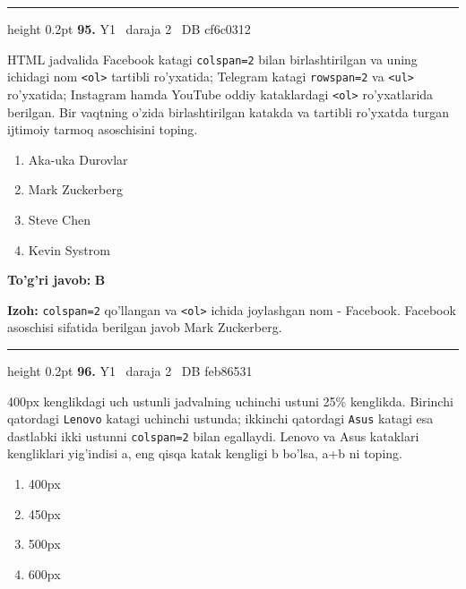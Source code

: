 \documentclass[10pt,a4paper,oneside]{article}
\begin{document}
\vspace{2mm}\hrule height 0.2pt \vspace{4mm}
\hypertarget{q95}{\textbf{\color{ink}95.}}  {\color{muted}\scriptsize Y1 \textbullet\ daraja 2 \textbullet\ DB cf6c0312}
\par
HTML jadvalida Facebook katagi \texttt{colspan=2} bilan birlashtirilgan va uning ichidagi nom \texttt{\textless{}ol\textgreater{}} tartibli ro'yxatida; Telegram katagi \texttt{rowspan=2} va \texttt{\textless{}ul\textgreater{}} ro'yxatida; Instagram hamda YouTube oddiy kataklardagi \texttt{\textless{}ol\textgreater{}} ro'yxatlarida berilgan. Bir vaqtning o'zida birlashtirilgan katakda va tartibli ro'yxatda turgan ijtimoiy tarmoq asoschisini toping.
\begin{enumerate}[label=\Alph*),leftmargin=9mm]
\item Aka-uka Durovlar
\item Mark Zuckerberg
\item Steve Chen
\item Kevin Systrom
\end{enumerate}
\begin{tcolorbox}[enhanced,breakable,colback=teal!4,colframe=teal!45!black,boxrule=0.45pt,arc=1.2mm,left=2.8mm,right=2.8mm,top=2mm,bottom=2mm,before skip=2mm,after skip=2mm]
\textbf{\color{teal}To'g'ri javob:} \textbf{B}
\par\smallskip
\textbf{Izoh:} \texttt{colspan=2} qo'llangan va \texttt{\textless{}ol\textgreater{}} ichida joylashgan nom - Facebook. Facebook asoschisi sifatida berilgan javob Mark Zuckerberg.
\end{tcolorbox}
\vspace{2mm}\hrule height 0.2pt \vspace{4mm}
\hypertarget{q96}{\textbf{\color{ink}96.}}  {\color{muted}\scriptsize Y1 \textbullet\ daraja 2 \textbullet\ DB feb86531}
\par
400px kenglikdagi uch ustunli jadvalning uchinchi ustuni 25\% kenglikda. Birinchi qatordagi \texttt{Lenovo} katagi uchinchi ustunda; ikkinchi qatordagi \texttt{Asus} katagi esa dastlabki ikki ustunni \texttt{colspan=2} bilan egallaydi. Lenovo va Asus kataklari kengliklari yig'indisi a, eng qisqa katak kengligi b bo'lsa, a+b ni toping.
\begin{enumerate}[label=\Alph*),leftmargin=9mm]
\item 400px
\item 450px
\item 500px
\item 600px
\end{enumerate}
\end{document}
